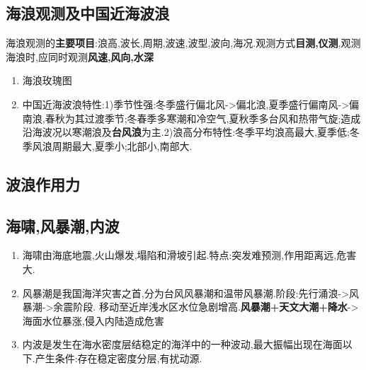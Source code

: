 	\subsection{海浪观测及中国近海波浪}
		海浪观测的\textbf{主要项目}:浪高,波长,周期,波速,波型,波向,海况.观测方式\textbf{目测,仪测},观测海浪时,应同时观测\textbf{风速,风向,水深}
		\begin{enumerate}
			\item 海浪玫瑰图
			\item 中国近海波浪特性:1)季节性强:冬季盛行偏北风->偏北浪,夏季盛行偏南风->偏南浪,春秋为其过渡季节;冬春季多寒潮和冷空气,夏秋季多台风和热带气旋;造成沿海波况以寒潮浪及\textbf{台风浪}为主.2)浪高分布特性:冬季平均浪高最大,夏季低;冬季风浪周期最大,夏季小;北部小,南部大.
			
		\end{enumerate}
	
	\subsection{波浪作用力}
		
	\subsection{海啸,风暴潮,内波}
		\begin{enumerate}
			\item 海啸由海底地震,火山爆发,塌陷和滑坡引起.特点:突发难预测,作用距离远,危害大.
			\item 风暴潮是我国海洋灾害之首,分为台风风暴潮和温带风暴潮.阶段:先行涌浪->风暴潮->余震阶段. 移动至近岸浅水区水位急剧增高.\textbf{风暴潮+天文大潮+降水}->海面水位暴涨,侵入内陆造成危害
			\item 内波是发生在海水密度层结稳定的海洋中的一种波动,最大振幅出现在海面以下.产生条件:存在稳定密度分层,有扰动源.
		\end{enumerate}
		